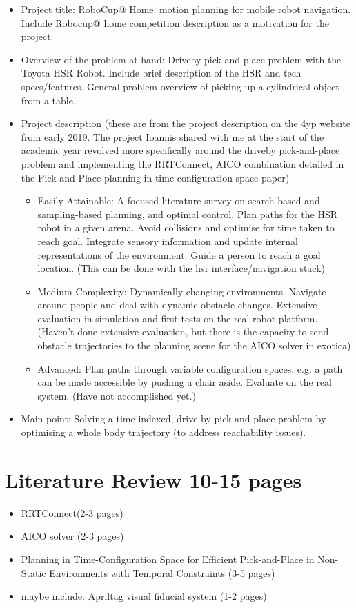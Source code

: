 \documentclass[12pt]{article}
\begin{document}
            
    \newpage
    \begin{itemize}
        \item Project title: RoboCup@ Home: motion planning for mobile robot navigation. Include Robocup@ home competition description as a motivation for the project.
        \item Overview of the problem at hand: Driveby pick and place problem with the Toyota HSR Robot. Include brief description of the HSR and tech specs/features. General problem overview of picking up a cylindrical object from a table.
        \item Project description (these are from the project description on the 4yp website from early 2019. The project Ioannis shared with me at the start of the academic year revolved more specifically around the driveby pick-and-place problem and implementing the RRTConnect, AICO combination detailed in the Pick-and-Place planning in time-configuration space paper)
        \begin{itemize}
            \item Easily Attainable: A focused literature survey on search-based and sampling-based planning, and optimal control. Plan paths for the HSR robot in a given arena. Avoid collisions and optimise for time taken to reach goal. Integrate sensory information and update internal representations of the environment. Guide a person to reach a goal location. (This can be done with the hsr interface/navigation stack)
            \item Medium Complexity: Dynamically changing environments. Navigate around people and deal with dynamic obstacle
            changes. Extensive evaluation in simulation and first tests on the real robot platform. (Haven't done extensive evaluation, but there is the capacity to send obstacle trajectories to the planning scene for the AICO solver in exotica)
            \item Advanced: Plan paths through variable configuration spaces, e.g. a path can be made accessible by pushing a chair aside.
            Evaluate on the real system. (Have not accomplished yet.)
        \end{itemize}
        \item Main point: Solving a time-indexed, drive-by pick and place problem by optimising a whole body trajectory (to address reachability issues).
    \end{itemize}
\section{Literature Review 10-15 pages}
    \begin{itemize}
        \item RRTConnect(2-3 pages)
        \item AICO solver (2-3 pages)
        \item Planning in Time-Configuration Space for Efficient Pick-and-Place in Non-Static Environments with Temporal Constraints (3-5 pages)
        \item maybe include: Apriltag visual fiducial system (1-2 pages)
    \end{itemize}
\end{document}

